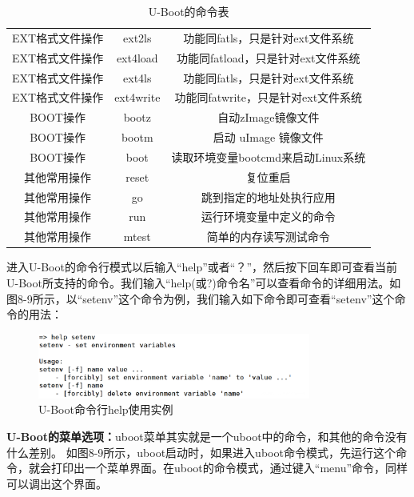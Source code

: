 \begin{table}[!ht]
\begin{tabular}{|c|c|c|}
        EXT格式文件操作 & ext2ls & 功能同fatls，只是针对ext文件系统 \\
        EXT格式文件操作 & ext4load & 功能同fatload，只是针对ext文件系统 \\
        EXT格式文件操作 &ext4ls & 功能同fatls，只是针对ext文件系统 \\
        EXT格式文件操作 &ext4write & 功能同fatwrite，只是针对ext文件系统 \\
        BOOT操作 & bootz & 自动zImage镜像文件\\
        BOOT操作 & bootm & 启动 uImage 镜像文件 \\
        BOOT操作 & boot& 读取环境变量bootcmd来启动Linux系统 \\
        其他常用操作 & reset & 复位重启 \\
        其他常用操作 & go & 跳到指定的地址处执行应用 \\
        其他常用操作 & run & 运行环境变量中定义的命令 \\
        其他常用操作 & mtest & 简单的内存读写测试命令 \\
   		\hline
   	\end{tabular}
   	\caption{U-Boot的命令表}
   	\label{U-Boot的命令表}
   \end{table}
   
     进入U-Boot的命令行模式以后输入“help”或者“？”，然后按下回车即可查看当前U-Boot所支持的命令。我们输入“help(或?)命令名”可以查看命令的详细用法。如图8-9所示，以“setenv”这个命令为例，我们输入如下命令即可查看“setenv”这个命令的用法：
     
     \begin{figure}[h]
     	\centering
     	\includegraphics[width=0.8\textwidth]{figures/08-01-U-Boot命令行help使用实例.png}
     	\caption{U-Boot命令行help使用实例}
     	\label{U-Boot命令行help使用实例}
     \end{figure}
     
     \textbf{ U-Boot的菜单选项：}uboot菜单其实就是一个uboot中的命令，和其他的命令没有什么差别。 如图8-9所示，uboot启动时，如果进入uboot命令模式，先运行这个命令，就会打印出一个菜单界面。在uboot的命令模式，通过键入“menu”命令，同样可以调出这个界面。
     
